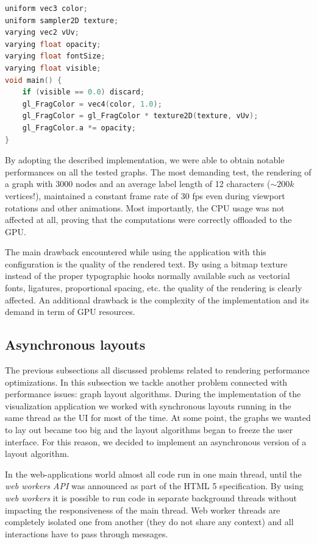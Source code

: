 \minipage{\textwidth}
\begin{lstlisting}[caption={Fragment shader for paint each face with the correct character.},label=lst:label-fragment,language=c]
uniform vec3 color;
uniform sampler2D texture;
varying vec2 vUv;
varying float opacity;
varying float fontSize;
varying float visible;
void main() {
    if (visible == 0.0) discard;
    gl_FragColor = vec4(color, 1.0);
    gl_FragColor = gl_FragColor * texture2D(texture, vUv);
    gl_FragColor.a *= opacity;
}
\end{lstlisting}
\endminipage

By adopting the described implementation, we were able to obtain notable performances on all the tested graphs. The most demanding test, the rendering of a graph with 3000 nodes and an average label length of 12 characters ($\sim200k$ vertices!), maintained a constant frame rate of 30 fps even during viewport rotations and other animations. Most importantly, the CPU usage was not affected at all, proving that the computations were correctly offloaded to the GPU.

The main drawback encountered while using the application with this configuration is the quality of the rendered text. By using a bitmap texture instead of the proper typographic hooks normally available such as vectorial fonts, ligatures, proportional spacing, etc. the quality of the rendering is clearly affected. An additional drawback is the complexity of the implementation and its demand in term of GPU resources.

\subsection{Asynchronous layouts}

The previous subsections all discussed problems related to rendering performance optimizations. In this subsection we tackle another problem connected with performance issues: graph layout algorithms. During the implementation of the visualization application we worked with synchronous layouts running in the same thread as the UI for most of the time. At some point, the graphs we wanted to lay out became too big and the layout algorithms began to freeze the user interface. For this reason, we decided to implement an asynchronous version of a layout algorithm.

In the web-applications world almost all code run in one main thread, until the \emph{web workers API} was announced as part of the HTML 5 specification. By using \emph{web workers} it is possible to run code in separate background threads without impacting the responsiveness of the main thread. Web worker threads are completely isolated one from another (they do not share any context) and all interactions have to pass through messages.

